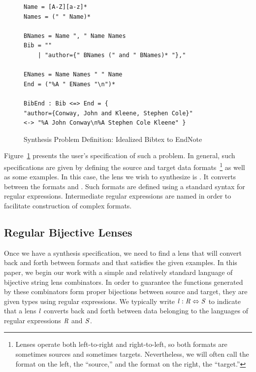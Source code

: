 \documentclass[numbers]{sigplanconf}
\begin{document}
\begin{figure}
\begin{lstlisting}
Name = [A-Z][a-z]*
Names = (" " Name)*

BNames = Name ", " Name Names
Bib = ""
    | "author={" BNames (" and " BNames)* "},"

ENames = Name Names " " Name
End = ("%A " ENames "\n")*

BibEnd : Bib <=> End = {
"author={Conway, John and Kleene, Stephen Cole}"
<-> "%A John Conway\n%A Stephen Cole Kleene" }
\end{lstlisting}
\caption{Synthesis Problem Definition: Idealized Bibtex to EndNote}
\label{fig:bibend-spec}
\end{figure}

Figure~\ref{fig:bibend-spec} presents
the user's specification of such a problem.  In general, such specifications are
given by defining the source and target data formats~\footnote{Lenses
operate both left-to-right and right-to-left, so both formats are sometimes
sources and sometimes targets. Nevertheless, we will often call the
format on the left, the ``source,'' and the format on the right, 
the ``target.''} as well as some examples.  In this case, the lens
we wish to synthesize is .  It converts between 
the formats  and .
Such formats are defined using a standard syntax for regular expressions.
Intermediate regular expressions are named in order to facilitate
construction of complex formats.

\subsection{Regular Bijective Lenses}
Once we have a synthesis specification, we need to find a lens that
will convert back and forth between formats and that satisfies the
given examples.  In this paper, we begin our work with a simple and 
relatively standard language of bijective string lens combinators.
In order to guarantee the functions generated by these combinators
form proper bijections between source and target, they are given types using
regular expressions.  We typically write
$\mathit{l} : \mathit{R} \Leftrightarrow \mathit{S}$ to indicate that a lens $\mathit{l}$
converts back and forth between data belonging
to the languages of regular expressions
$\mathit{R}$ and $\mathit{S}$.
\end{document}
